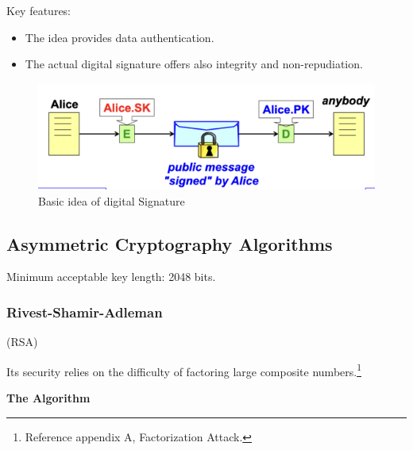 Key features:
\begin{itemize}
    \item The idea provides data authentication.
    \item The actual digital signature offers also integrity and non-repudiation.
\end{itemize}


\begin{figure}[H]
    \centering
    \includegraphics[width=0.5\linewidth]{Images/Cryptography/basic_digital_signature.png}
    \caption{Basic idea of digital Signature}
\end{figure}


\subsection{Asymmetric Cryptography Algorithms}
Minimum acceptable key length: 2048 bits.

\subsubsection{Rivest-Shamir-Adleman}
\begin{center}
    (RSA)
\end{center}

Its security relies on the difficulty of factoring large composite numbers.\footnote{Reference appendix A, Factorization Attack.}

\begin{center}
    \textbf{The Algorithm}
\end{center}

